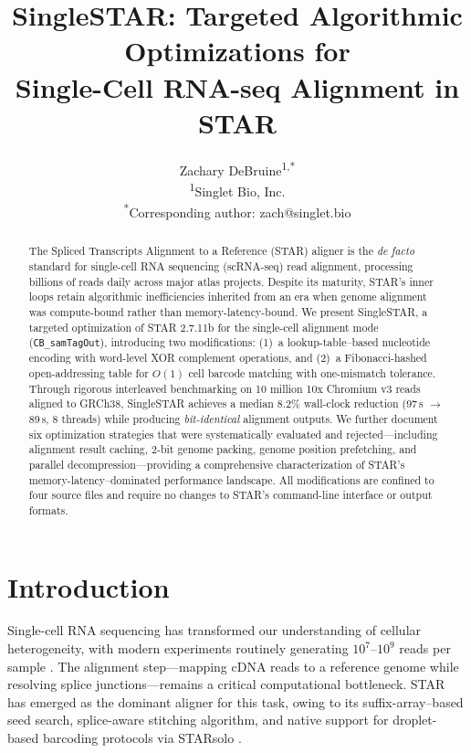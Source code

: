 \documentclass[11pt,twocolumn]{article}
\title{\textbf{SingleSTAR: Targeted Algorithmic Optimizations for\\Single-Cell RNA-seq Alignment in STAR}}
\author{
  Zachary DeBruine\textsuperscript{1,*}
  \\[4pt]
  \textsuperscript{1}Singlet Bio, Inc.\\
  \textsuperscript{*}Corresponding author: zach@singlet.bio
}
\date{}
\begin{document}
\maketitle

\begin{abstract}
The Spliced Transcripts Alignment to a Reference (STAR) aligner is the \emph{de facto} standard for single-cell RNA sequencing (scRNA-seq) read alignment, processing billions of reads daily across major atlas projects. Despite its maturity, STAR's inner loops retain algorithmic inefficiencies inherited from an era when genome alignment was compute-bound rather than memory-latency-bound. We present SingleSTAR, a targeted optimization of STAR 2.7.11b for the single-cell alignment mode (\texttt{CB\_samTagOut}), introducing two modifications: (1)~a lookup-table--based nucleotide encoding with word-level XOR complement operations, and (2)~a Fibonacci-hashed open-addressing table for $O(1)$ cell barcode matching with one-mismatch tolerance. Through rigorous interleaved benchmarking on 10 million 10x Chromium v3 reads aligned to GRCh38, SingleSTAR achieves a median 8.2\% wall-clock reduction (97\,s $\to$ 89\,s, 8 threads) while producing \emph{bit-identical} alignment outputs. We further document six optimization strategies that were systematically evaluated and rejected---including alignment result caching, 2-bit genome packing, genome position prefetching, and parallel decompression---providing a comprehensive characterization of STAR's memory-latency--dominated performance landscape. All modifications are confined to four source files and require no changes to STAR's command-line interface or output formats.
\end{abstract}

\section{Introduction}

Single-cell RNA sequencing has transformed our understanding of cellular heterogeneity, with modern experiments routinely generating $10^7$--$10^9$ reads per sample \citep{zheng2017massively,hao2024dictionary}. The alignment step---mapping cDNA reads to a reference genome while resolving splice junctions---remains a critical computational bottleneck. STAR \citep{dobin2013star} has emerged as the dominant aligner for this task, owing to its suffix-array--based seed search, splice-aware stitching algorithm, and native support for droplet-based barcoding protocols via STARsolo \citep{kaminow2021starsolo}.
\end{document}
